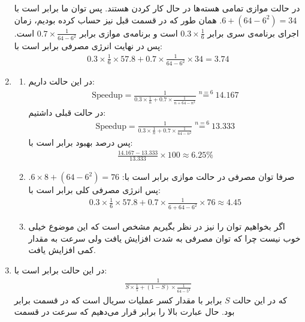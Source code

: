 \begin{enumerate}
    در حالت موازی تمامی هسته‌ها در حال کار کردن هستند. پس توان ما برابر است با
    $6 + (64 - 6^2) = 34$.
    همان طور که در قسمت قبل نیز حساب کرده بودیم، زمان اجرای برنامه‌ی سری برابر
    $0.3 \times \frac{1}{6}$
    است و برنامه‌ی موازی برابر
    $0.7 \times \frac{1}{64 - 6^2}$
    است. پس در نهایت انرژی مصرفی برابر است با:
    \begin{gather*}
        0.3 \times \frac{1}{6} \times 57.8 + 0.7 \times \frac{1}{64 - 6^2} \times 34 = 3.74
    \end{gather*}
    \item \begin{enumerate}
        \item در این حالت داریم:
        \begin{gather*}
            \text{Speedup} = \frac{1}{0.3 \times \frac{1}{n} + 0.7 \times \frac{1}{n + 64 - n^2}} \stackrel{n = 6}{=} 14.167
        \end{gather*}
        در حالت قبلی داشتیم:
        \begin{gather*}
            \text{Speedup} = \frac{1}{0.3 \times \frac{1}{n} + 0.7 \times \frac{1}{64 - n^2}} \stackrel{n = 6}{=} 13.333
        \end{gather*}
        پس درصد بهبود برابر است با:
        \begin{gather*}
            \frac{14.167 - 13.333}{13.333} \times 100 \approx 6.25 \%
        \end{gather*}
        \item صرفا توان مصرفی در حالت موازی برابر است با:
        $6 \times 8 + (64 - 6^2) = 76$.
        پس انرژی مصرفی کلی برابر است با:
        \begin{gather*}
            0.3 \times \frac{1}{6} \times 57.8 + 0.7 \times \frac{1}{6 + 64 - 6^2} \times 76 \approx 4.45
        \end{gather*}
        \item اگر بخواهیم توان را نیز در نظر بگیریم مشخص است که این موضوع خیلی خوب نیست چرا که توان مصرفی به شدت
        افزایش یافت ولی سرعت به مقدار کمی افزایش یافت.
    \end{enumerate}
    \item در این حالت  برابر است با:
    \begin{gather*}
        \frac{1}{S \times \frac{1}{5} + (1 - S) \times \frac{1}{64 - 5^2}}
    \end{gather*}
    که در این حالت $S$ برابر با مقدار کسر عملیات سریال است که در قسمت  برابر  بود.
    حال عبارت بالا را برابر
    قرار می‌دهیم که سرعت در قسمت

\end{enumerate}
